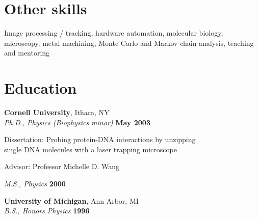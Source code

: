 \documentclass[margin,line]{resume}
\begin{document}
\begin{resume}
    \section{\mysidestyle Other skills} 

    Image processing / tracking, hardware automation, molecular biology, microscopy, metal machining, Monte Carlo and Markov chain analysis, teaching and mentoring  
 
 
    \section{\mysidestyle Education}

    \textbf{Cornell University}, Ithaca, NY \vspace{2mm}\\\vspace{1mm}%
    \textsl{Ph.D., Physics (Biophysics minor)} \hfill \textbf{ May 2003}\vspace{-3mm}\\\vspace{-1mm}%
    \begin{list2}
        \item Dissertation: Probing protein-DNA interactions by unzipping \\
        single DNA molecules with a laser trapping microscope
        \item Advisor:  Professor Michelle D. Wang
    \end{list2}\vspace{-1.5mm}

    \textsl{M.S., Physics} \hfill \textbf{2000}\\\vspace{0mm}%

    \textbf{University of Michigan}, Ann Arbor, MI \vspace{2mm}\\\vspace{1mm}%
    \textsl{B.S., Honors Physics} \hfill \textbf{1996}\vspace{-3mm}\\\vspace{-1mm}%
    

\end{resume}
\end{document}

